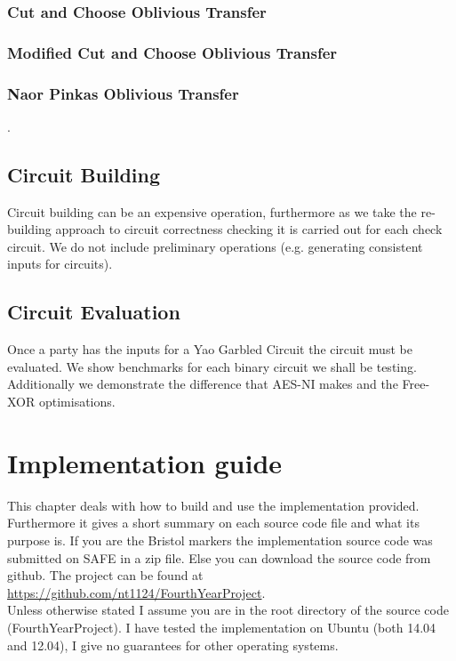 \documentclass[ %
                    author={Nicholas Tutte},
                supervisor={Prof. Nigel Smart},
                    degree={MEng},
                     title={Secure Two Party Computation},
                  subtitle={A practical comparison of recent protocols},
                      type={Research - GG1K},
                      year={2015} ]{dissertation}
\begin{document}
\begin{appendices}
				\subsection{Cut and Choose Oblivious Transfer}

				\subsection{Modified Cut and Choose Oblivious Transfer}

				\subsection{Naor Pinkas Oblivious Transfer}

					.

			\section{Circuit Building}

				Circuit building can be an expensive operation, furthermore as we take the re-building approach to circuit correctness checking it is carried out for each check circuit. We do not include preliminary operations (e.g. generating consistent inputs for circuits).

			\section{Circuit Evaluation}

				Once a party has the inputs for a Yao Garbled Circuit the circuit must be evaluated. We show benchmarks for each binary circuit we shall be testing. Additionally we demonstrate the difference that AES-NI makes and the Free-XOR optimisations. 

		\chapter{Implementation guide}
			This chapter deals with how to build and use the implementation provided. Furthermore it gives a short summary on each source code file and what its purpose is. If you are the Bristol markers the implementation source code was submitted on SAFE in a zip file. Else you can download the source code from github. The project can be found at \url{https://github.com/nt1124/FourthYearProject}.\\
			
			Unless otherwise stated I assume you are in the root directory of the source code (FourthYearProject). I have tested the implementation on Ubuntu (both 14.04 and 12.04), I give no guarantees for other operating systems.


\end{appendices}
\end{document}
